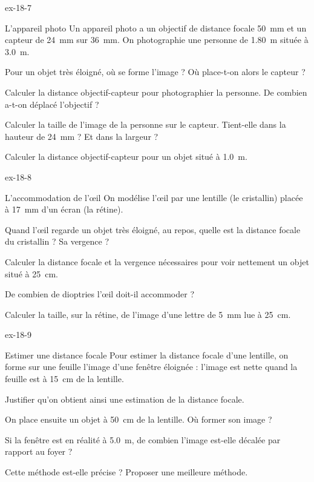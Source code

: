 \begin{blocLivre}{ex-18-7}
\begin{exercice}[2]{L'appareil photo}
Un appareil photo a un objectif de distance focale \qty{50}{mm} et un capteur de \qty{24}{mm} sur \qty{36}{mm}. On photographie une personne de
\qty{1,80}{m} située à \qty{3,0}{m}.
\begin{questions}
\item Pour un objet très éloigné, où se forme l'image ? Où place-t-on alors le capteur ?
\item Calculer la distance objectif-capteur pour photographier la personne. De combien a-t-on déplacé l'objectif ?
\item Calculer la taille de l'image de la personne sur le capteur. Tient-elle dans la hauteur de \qty{24}{mm} ? Et dans la largeur ?
\item Calculer la distance objectif-capteur pour un objet situé à \qty{1,0}{m}.
\end{questions}
\end{exercice}
\end{blocLivre}
\begin{blocLivre}{ex-18-8}
\begin{exercice}[2]{L'accommodation de l'œil}
On modélise l'œil par une lentille (le cristallin) placée à \qty{17}{mm} d'un écran (la rétine).
\begin{questions}
\item Quand l'œil regarde un objet très éloigné, au repos, quelle est la distance focale du cristallin ? Sa vergence ?
\item Calculer la distance focale et la vergence nécessaires pour voir nettement un objet situé à \qty{25}{cm}.
\item De combien de dioptries l'œil doit-il accommoder ?
\item Calculer la taille, sur la rétine, de l'image d'une lettre de \qty{5}{mm} lue à \qty{25}{cm}.
\end{questions}
\end{exercice}
\end{blocLivre}
\begin{blocLivre}{ex-18-9}
\begin{exercice}[2]{Estimer une distance focale}
Pour estimer la distance focale d'une lentille, on forme sur une feuille l'image d'une fenêtre éloignée : l'image est nette quand la
feuille est à \qty{15}{cm} de la lentille.
\begin{questions}
\item Justifier qu'on obtient ainsi une estimation de la distance focale.
\item On place ensuite un objet à \qty{50}{cm} de la lentille. Où former son image ?
\item Si la fenêtre est en réalité à \qty{5,0}{m}, de combien l'image est-elle décalée par rapport au foyer ?
\item Cette méthode est-elle précise ? Proposer une meilleure méthode.
\end{questions}
\end{exercice}
\end{blocLivre}
